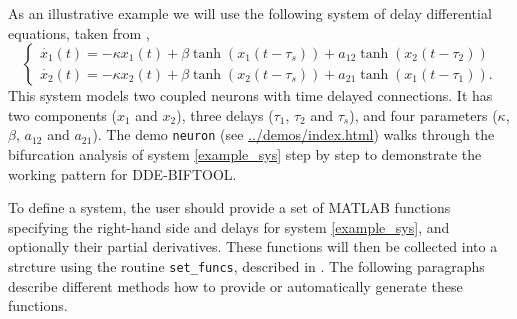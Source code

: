 \documentclass[10pt]{scrartcl}
\newcommand{\DDEBIFCODE}{\textsc{DDE-BIFTOOL}}
\newcommand{\demobase}{\url{../demos/index.html}}
\newcommand{\blist}[1]{\mbox{\lstinline!#1!}}
\begin{document}
As an illustrative example we will use the following system of delay 
differential
equations, taken from \cite{Shay99},
\begin{equation}\label{example_sys}
\left\{
\begin{array}{l}
\dot{x_1}(t)=-\kappa x_1(t)+\beta \tanh(x_1(t-\tau_s))+a_{12}\tanh(x_2(t-\tau_2)) \\
\dot{x_2}(t)=-\kappa x_2(t)+\beta \tanh(x_2(t-\tau_s))+a_{21}\tanh(x_1(t-\tau_1)) .
\end{array}
\right.
\end{equation}
This system models two coupled neurons with time delayed connections.
It has two components ($x_1$ and $x_2$), three delays ($\tau_1$,
$\tau_2$ and $\tau_s$), and four parameters ($\kappa$, $\beta$,
$a_{12}$ and $a_{21}$).  The demo \texttt{neuron} (see
\demobase{}) walks through the
bifurcation analysis of system \eqref{example_sys} step by step to
demonstrate the working pattern for \DDEBIFCODE.

To define a system, the user should provide a set of MATLAB functions
specifying the right-hand side and delays for system
\eqref{example_sys}, and optionally their partial derivatives. These functions will then be collected into a strcture using the routine \blist{set_funcs}, described in . The
following paragraphs describe different methods how to provide or
automatically generate these functions.
\end{document}
